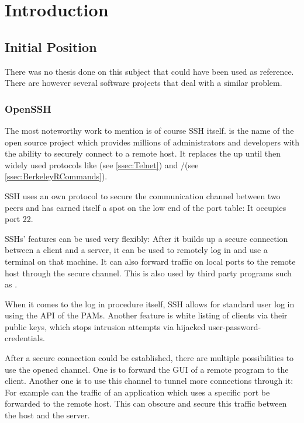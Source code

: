 \documentclass[10pt,a4paper,titlepage,twoside,english,final]{zhawreprt}
\begin{document}
\makedeclarationoforiginality

\tableofcontents

\chapter{Introduction}\label{chp:Introduction}
\section{Initial Position}\label{sec:InitialPosition}
There was no thesis done on this subject that could have been used as reference.
There are however several software projects that deal with a similar problem.

\subsection{OpenSSH}\label{ssec:OpenSSH}
The most noteworthy work to mention is of course \gls{SSH} itself.
\cite{openssh} is the name of the open source project which provides millions of administrators and developers with the ability to securely connect to a remote host.
It replaces the up until then widely used protocols like \cite{telnet}(see \ref{ssec:Telnet}) and \cite{rlogin}/\cite{rsh}(see \ref{ssec:BerkeleyRCommands}).

\gls{SSH} uses an own protocol to secure the communication channel between two peers and has earned itself a spot on the low end of the \gls{port} table: It occupies \gls{port} 22.

\gls{SSH}s' features can be used very flexibly: After it builds up a secure connection between a client and a server, it can be used to remotely log in and use a \gls{terminal} on that machine.
It can also forward traffic on local ports to the remote host through the secure channel.
This is also used by third party programs such as \cite{rsync}.

When it comes to the log in procedure itself, \gls{SSH} allows for standard user log in using the \gls{API} of the \glspl{PAM}.
Another feature is white listing of clients via their public keys, which stops intrusion attempts via hijacked user-password-credentials.

After a secure connection could be established, there are multiple possibilities to use the opened channel.
One is to forward the \gls{GUI} of a remote program to the client.
Another one is to use this channel to tunnel more connections through it: For example can the traffic of an application which uses a specific \gls{port} be forwarded to the remote host.
This can obscure and secure this traffic between the host and the server.
\end{document}
